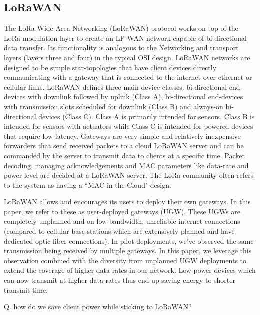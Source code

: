 \subsection{LoRaWAN}
\label{sec:lorawan}

The LoRa Wide-Area Networking (LoRaWAN) protocol works on top of the LoRa
modulation layer to create an LP-WAN network capable of bi-directional data
transfer. Its functionality is analogous to the Networking and transport
layers (layers three and four) in the typical OSI design. LoRaWAN networks
are designed to be simple star-topologies that have client devices directly
communicating with a gateway that is connected to the internet over ethernet
or cellular links. LoRaWAN defines three main device classes: bi-directional
end-devices with downlink followed by uplink (Class A), bi-directional
end-devices with transmission slots scheduled for downlink (Class B) and
always-on bi-directional devices (Class C). Class A is primarily intended for
sensors, Class B is intended for sensors with actuators while Class C is
intended for powered devices that require low-latency. Gateways are very
simple and relatively inexpensive forwarders that send received packets to a
cloud LoRaWAN server and can be commanded by the server to transmit data to
clients at a specific time. Packet decoding, managing acknowledgements and
MAC parameters like data-rate and power-level are decided at a LoRaWAN
server. The LoRa community often refers to the system as having a
``MAC-in-the-Cloud" design.

LoRaWAN allows and encourages its users to deploy their own gateways. In this
paper, we refer to these as user-deployed gateways (UGW). These UGWs are
completely unplanned and on low-bandwidth, unreliable internet connections
(compared to cellular base-stations which are extensively planned and have
dedicated optic fiber connections). In pilot deployments, we've observed the
same transmission being received by multiple gateways. In this paper, we
leverage this observation combined with the diversity from unplanned UGW
deployments to extend the coverage of higher data-rates in our network.
Low-power devices which can now transmit at higher data rates thus end up
saving energy to shorter transmit time.

{\color{blue}

Q. how do we save client power while sticking to LoRaWAN?
}